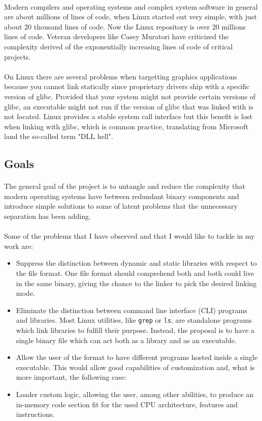 \documentclass[12pt]{article}
\begin{document}
	\paragraph{}Modern compilers and operating systems and complex system software in general are about millions of lines of code, when Linux started out very simple, with just about 20 thousand lines of code. Now the Linux repository is over 20 millions lines of code. Veteran developers like Casey Muratori have criticized the complexity derived of the exponentially increasing lines of code of critical projects\cite{thirty-million}.
	\paragraph{}On Linux there are several problems when targetting graphics applications because you cannot link statically since proprietary drivers ship with a specific version of glibc. Provided that your system might not provide certain versions of glibc, an executable might not run if the version of glibc that was linked with is not located. Linux provides a stable system call interface but this benefit is lost when linking with glibc, which is common practice, translating from Microsoft land the so-called term "DLL hell".
	\subsection{Goals}
	\paragraph{}The general goal of the project is to untangle and reduce the complexity that modern operating systems have between redundant binary components and introduce simple solutions to some of latent problems that the unnecessary separation has been adding.	
	\paragraph{}Some of the problems that I have observed and that I would like to tackle in my work are:
	\begin{itemize}
		\item Suppress the distinction between dynamic and static libraries with respect to the file format. One file format should comprehend both and both could live in the same binary, giving the chance to the linker to pick the desired linking mode.
		\item Eliminate the distinction between command line interface (CLI) programs and libraries. Most Linux utilities, like \verb|grep| or \verb|ls|, are standalone programs which link libraries to fulfill their purpose. Instead, the proposal is to have a single binary file which can act both as a library and as an executable.
		\item Allow the user of the format to have different programs hosted inside a single executable. This would allow good capabilities of customization and, what is more important, the following case:
		\item Loader custom logic, allowing the user, among other abilities, to produce an in-memory code section fit for the used CPU architecture, features and instructions.
	\end{itemize}
\end{document}
